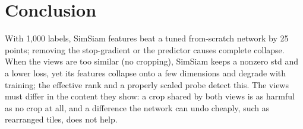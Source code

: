 \documentclass[10pt,twocolumn,letterpaper]{article}
\begin{document}
\section{Conclusion}
\label{sec:conclusion}
With 1,000 labels, SimSiam features beat a tuned from-scratch network by 25 points; removing the stop-gradient or the predictor causes complete collapse.
When the views are too similar (no cropping), SimSiam keeps a nonzero std and a lower loss, yet its features collapse onto a few dimensions and degrade with training; the effective rank and a properly scaled probe detect this.
The views must differ in the content they show: a crop shared by both views is as harmful as no crop at all, and a difference the network can undo cheaply, such as rearranged tiles, does not help.

{
    \small
    
    
}
\end{document}
